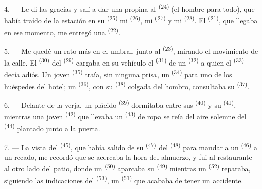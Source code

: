 4. --- Le di las gracias y salí a dar una propina al 
\textsuperscript{(24)} (el hombre para todo), que había traído de la estación en
su  \textsuperscript{(25)} mi 
\textsuperscript{(26)}, mi  \textsuperscript{(27)} y mi  \textsuperscript{(28)}. El  \textsuperscript{(21)}, que llegaba en
ese momento, me entregó una  \textsuperscript{(22)}.

5. --- Me quedé un rato más en el umbral, junto al 
\textsuperscript{(23)}, mirando el movimiento de la calle. El 
\textsuperscript{(30)} del  \textsuperscript{(29)} cargaba en su vehículo
el  \textsuperscript{(31)} de un  \textsuperscript{(32)} a quien
el  \textsuperscript{(33)} decía adiós. Un joven
 \textsuperscript{(35)} traía, sin ninguna prisa, un
 \textsuperscript{(34)} para uno de los huéspedes del hotel; un
 \textsuperscript{(36)}, con su 
\textsuperscript{(38)} colgada del hombro, consultaba su 
\textsuperscript{(37)}.

\VUsaut{4.0mm}
\VUsaut{3.0mm}

6. --- Delante de la verja, un plácido  \textsuperscript{(39)}
dormitaba entre sus  \textsuperscript{(40)} y su
 \textsuperscript{(41)}, mientras una joven
 \textsuperscript{(42)} que llevaba un 
\textsuperscript{(43)} de ropa se reía del aire solemne del 
\textsuperscript{(44)} plantado junto a la puerta.

7. --- La vista del  \textsuperscript{(45)}, que había salido de su
 \textsuperscript{(47)} del  \textsuperscript{(48)} para mandar
a un  \textsuperscript{(46)} a un recado, me recordó que se acercaba
la hora del almuerzo, y fui al restaurante al otro lado del patio, donde
un  \textsuperscript{(50)} aparcaba su 
\textsuperscript{(49)} mientras un  \textsuperscript{(52)} reparaba,
siguiendo las indicaciones del  \textsuperscript{(53)}, un
 \textsuperscript{(51)} que acababa de tener un
accidente.

